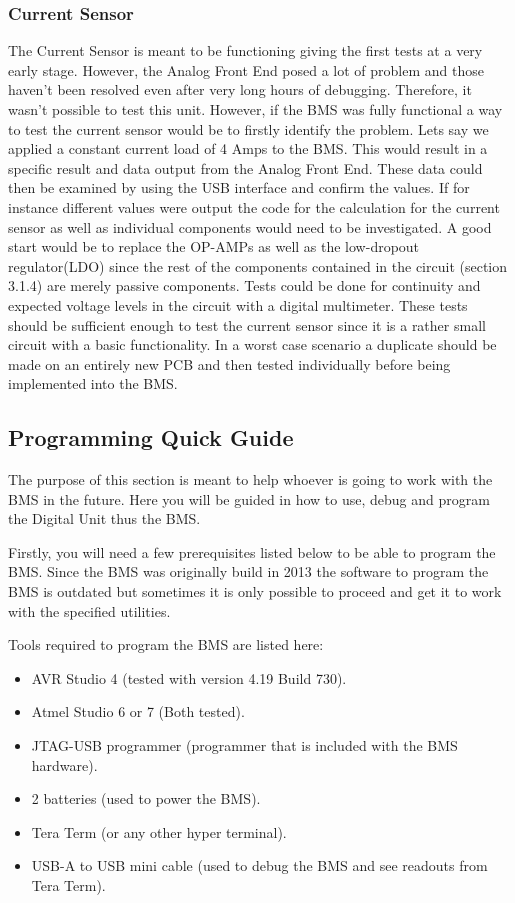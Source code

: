 \subsubsection{Current Sensor}
The Current Sensor is meant to be functioning giving the first tests at a very early stage. However, the Analog Front End posed a lot of problem and those haven't been resolved even after very long hours of debugging. Therefore, it wasn't possible to test this unit. However, if the BMS was fully functional a way to test the current sensor would be to firstly identify the problem. Lets say we applied a constant current load of 4 Amps to the BMS. This would result in a specific result and data output from the Analog Front End. These data could then be examined by using the USB interface and confirm the values. If for instance different values were output the code for the calculation for the current sensor as well as individual components would need to be investigated. A good start would be to replace the OP-AMPs as well as the low-dropout regulator(LDO) since the rest of the components contained in the circuit\cite{BMSDocumentation} (section 3.1.4) are merely passive components. Tests could be done for continuity and expected voltage levels in the circuit with a digital multimeter. These tests should be sufficient enough to test the current sensor since it is a rather small circuit with a basic functionality. In a worst case scenario a duplicate should be made on an entirely new PCB and then tested individually before being implemented into the BMS.    

\subsection{Programming Quick Guide}
\label{sec:BMSDebugging}
The purpose of this section is meant to help whoever is going to work with the BMS in the future. Here you will be guided in how to use, debug and program the Digital Unit thus the BMS.

Firstly, you will need a few prerequisites listed below to be able to program the BMS. Since the BMS was originally build in 2013 the software to program the BMS is outdated but sometimes it is only possible to proceed and get it to work with the specified utilities. 

Tools required to program the BMS are listed here:
	\begin{itemize}
		\item AVR Studio 4 (tested with version 4.19 Build 730).
		\item Atmel Studio 6 or 7 (Both tested).
		\item JTAG-USB programmer (programmer that is included with the BMS hardware).
		\item 2 batteries (used to power the BMS).
		\item Tera Term (or any other hyper terminal).
		\item USB-A to USB mini cable (used to debug the BMS and see readouts from Tera Term).
	\end{itemize}
	
